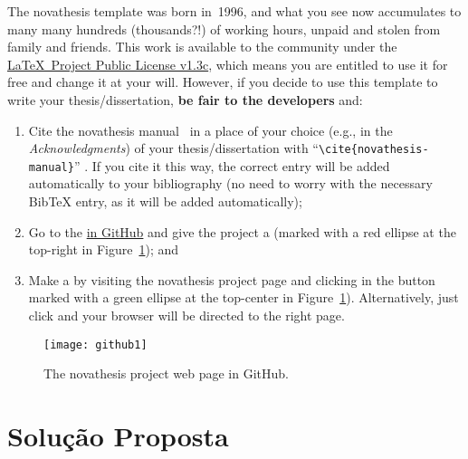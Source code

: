 The \gls{novathesis} template was born in~1996, and what you see now accumulates to many many hundreds (thousands?!) of working hours, unpaid and stolen from family and friends.  This work is available to the community under the \href{LaTeX project public license}{\LaTeX\ Project Public License v1.3c}, which means you are entitled to use it for free and change it at your will.  However, if you decide to use this template to write your thesis/dissertation, \textbf{be fair to the developers} and:
\begin{enumerate}
  \item {} Cite the \gls{novathesis} manual~\cite{novathesis-manual} in a place of your choice (e.g., in the \emph{Acknowledgments}) of your thesis/dissertation with “\verb!\cite{novathesis-manual}!” .  If you cite it this way, the correct entry will be added automatically to your bibliography (no need to worry with the necessary BibTeX entry, as it will be added automatically);
  \item Go to the
\href{https://github.com/joaomlourenco/novathesis}{ in GitHub} and give the project a  (marked with a red ellipse at the top-right in Figure~\ref{fig:github}); and
  \item Make a  by visiting the \gls{novathesis} project page and clicking in the button marked with a green ellipse at the top-center in Figure~\ref{fig:github}).  Alternatively, just click \href{https://www.paypal.com/donate/?hosted_button_id=8WA8FRVMB78W8}{} and your browser will be directed to the right page.
\end{enumerate}

\begin{figure}[htbp]
    \centering
    \texttt{[image: github1]}
    \caption{The \gls{novathesis} project web page in GitHub.}
    \label{fig:github}
\end{figure}

\section{Solução Proposta}
\label{sec:solution}
